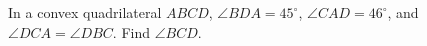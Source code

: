 In a convex quadrilateral $ABCD$, $\angle BDA=45^\circ$, $\angle CAD=46^\circ$, and $\angle DCA=\angle DBC$. Find $\angle BCD$.
